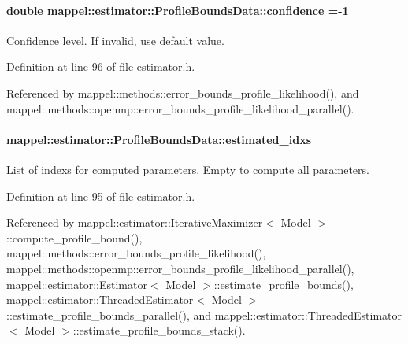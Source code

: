 \paragraph[{\texorpdfstring{confidence}{confidence}}]{\setlength{\rightskip}{0pt plus 5cm}double mappel\+::estimator\+::\+Profile\+Bounds\+Data\+::confidence =-\/1}\hypertarget{structmappel_1_1estimator_1_1ProfileBoundsData_a7c56b494bd5c2af6fcf6f8b40416a203}{}\label{structmappel_1_1estimator_1_1ProfileBoundsData_a7c56b494bd5c2af6fcf6f8b40416a203}


Confidence level. If invalid, use default value. 



Definition at line 96 of file estimator.\+h.



Referenced by mappel\+::methods\+::error\+\_\+bounds\+\_\+profile\+\_\+likelihood(), and mappel\+::methods\+::openmp\+::error\+\_\+bounds\+\_\+profile\+\_\+likelihood\+\_\+parallel().

\paragraph[{\texorpdfstring{estimated\+\_\+idxs}{estimated_idxs}}]{ mappel\+::estimator\+::\+Profile\+Bounds\+Data\+::estimated\+\_\+idxs}\hypertarget{structmappel_1_1estimator_1_1ProfileBoundsData_a04704405afc4353671f67cee0f221f6b}{}\label{structmappel_1_1estimator_1_1ProfileBoundsData_a04704405afc4353671f67cee0f221f6b}


List of indexs for computed parameters. Empty to compute all parameters. 



Definition at line 95 of file estimator.\+h.



Referenced by mappel\+::estimator\+::\+Iterative\+Maximizer$<$ Model $>$\+::compute\+\_\+profile\+\_\+bound(), mappel\+::methods\+::error\+\_\+bounds\+\_\+profile\+\_\+likelihood(), mappel\+::methods\+::openmp\+::error\+\_\+bounds\+\_\+profile\+\_\+likelihood\+\_\+parallel(), mappel\+::estimator\+::\+Estimator$<$ Model $>$\+::estimate\+\_\+profile\+\_\+bounds(), mappel\+::estimator\+::\+Threaded\+Estimator$<$ Model $>$\+::estimate\+\_\+profile\+\_\+bounds\+\_\+parallel(), and mappel\+::estimator\+::\+Threaded\+Estimator$<$ Model $>$\+::estimate\+\_\+profile\+\_\+bounds\+\_\+stack().

